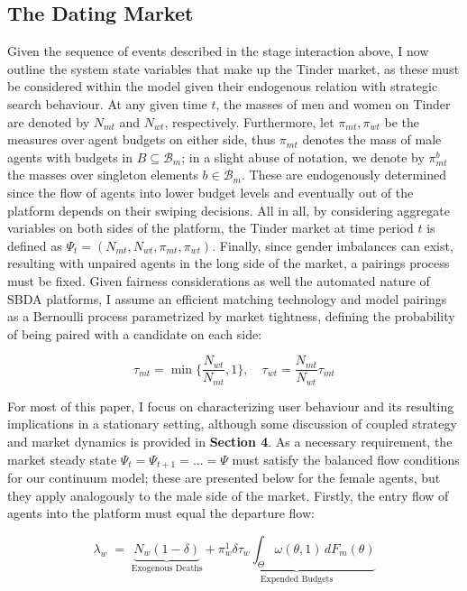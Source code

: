 \subsection{The Dating Market}
Given the sequence of events described in the stage interaction above, I now outline the system state variables that make up the Tinder market, as these must be considered within the model given their endogenous relation with strategic search behaviour. At any given time $t$, the masses of men and women on Tinder are denoted by $N_{mt}$ and $N_{wt}$, respectively. Furthermore, let $\pi_{mt}, \pi_{wt}$ be the measures over agent budgets on either side, thus $\pi_{mt}$ denotes the mass of male agents with budgets in $B \subseteq \mathcal{B}_m$; in a slight abuse of notation, we denote by $\pi_{mt}^b$ the masses over singleton elements $b\in \mathcal{B}_m$. These are endogenously determined since the flow of agents into lower budget levels and eventually out of the platform depends on their swiping decisions. All in all, by considering aggregate variables on both sides of the platform, the Tinder market at time period $t$ is defined as $\Psi_t=(N_{mt},N_{wt},\pi_{mt},\pi_{wt})$. Finally, since gender imbalances can exist, resulting with unpaired agents in the long side of the market, a pairings process must be fixed. Given fairness considerations as well the automated nature of SBDA platforms, I assume an efficient matching technology and model pairings as a Bernoulli process parametrized by market tightness, defining the probability of being paired with a candidate on each side:

$$
\tau_{mt}=\min \Big\{\frac{N_{wt}}{N_{mt}} ,1 \Big\}, \quad \tau_{wt}= \frac{N_{mt}}{N_{wt}} \tau_{mt}
$$

For most of this paper, I focus on characterizing user behaviour and its resulting implications in a stationary setting, although some discussion of coupled strategy and market dynamics is provided in \textbf{Section 4}. As a necessary requirement, the market steady state $\Psi_t=\Psi_{t+1}=...=\Psi$ must satisfy the balanced flow conditions for our continuum model; these are presented below for the female agents, but they apply analogously to the male side of the market. Firstly, the entry flow of agents into the platform must equal the departure flow: 

\begin{equation} 
    \lambda_w\;=\; \underbrace{N_w (1-\delta)}_{\text{Exogenous Deaths}} + \underbrace{\pi_w^1 \delta \tau_w\int_{\Theta}\omega(\theta,1)\,dF_{m}(\theta)}_{\text{Expended Budgets}} 
\end{equation} 

